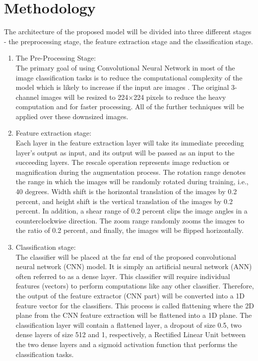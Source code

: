 \documentclass[12pt, a4paper]{report}
\begin{document}
\vfill
\pagebreak
\chapter{Methodology}
The architecture of the proposed model will be divided into three different stages - the preprocessing stage, the feature extraction stage and the classification stage. 
\begin{enumerate}

\item
The Pre-Processing Stage:\\
The primary goal of using Convolutional Neural Network in most of the image classification tasks is to reduce the computational complexity of the model which is likely to increase if the input are images . The original 3-channel images will be resized to 224×224 pixels to reduce the heavy computation and for faster processing. All of the further techniques will be applied over these downsized images. 

\item
Feature extraction stage:\\
Each layer in the feature extraction layer will take its immediate preceding layer's output as input, and its output will be passed as an input to the succeeding layers. The rescale operation represents image reduction or magnification during the augmentation process. The rotation range denotes the range in which the images will be randomly rotated during training, i.e., 40 degrees. Width shift is the horizontal translation of the images by 0.2 percent, and height shift is the vertical translation of the images by 0.2 percent. In addition, a shear range of 0.2 percent clips the image angles in a counterclockwise direction. The zoom range randomly zooms the images to the ratio of 0.2 percent, and finally, the images will be flipped horizontally.

\item
Classification stage:\\
The classifier will be placed at the far end of the proposed convolutional neural network (CNN) model. It is simply an artificial neural network (ANN) often referred to as a dense layer. This classifier will require individual features (vectors) to perform computations like any other classifier. Therefore, the output of the feature extractor (CNN part) will be converted into a 1D feature vector for the classifiers. This process is called flattening where the 2D plane from the CNN feature extraction will be flattened into a 1D plane. The classification layer will contain a flattened layer, a dropout of size 0.5, two dense layers of size 512 and 1, respectively, a Rectified Linear Unit between the two dense layers and a sigmoid activation function that performs the classification tasks.


\end{enumerate}
\end{document}
